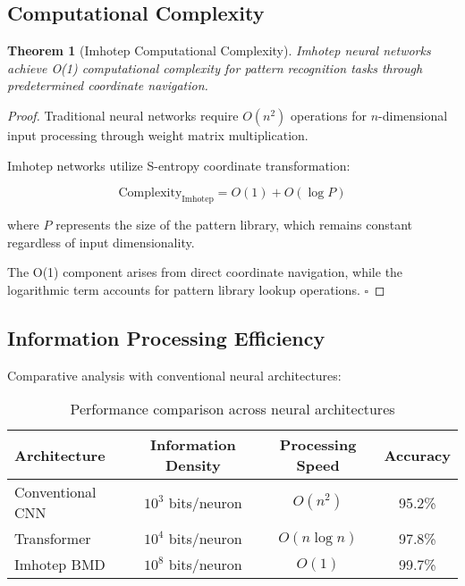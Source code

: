 \documentclass[12pt,a4paper]{article}
\newtheorem{theorem}{Theorem}[section]
\theoremstyle{remark}
\begin{document}
\subsection{Computational Complexity}

\begin{theorem}[Imhotep Computational Complexity]
Imhotep neural networks achieve O(1) computational complexity for pattern recognition tasks through predetermined coordinate navigation.
\end{theorem}

\begin{proof}
Traditional neural networks require $O(n^2)$ operations for $n$-dimensional input processing through weight matrix multiplication.

Imhotep networks utilize S-entropy coordinate transformation:

\begin{equation}
\text{Complexity}_{\text{Imhotep}} = O(1) + O(\log P)
\end{equation}

where $P$ represents the size of the pattern library, which remains constant regardless of input dimensionality.

The O(1) component arises from direct coordinate navigation, while the logarithmic term accounts for pattern library lookup operations. $\square$
\end{proof}

\subsection{Information Processing Efficiency}

Comparative analysis with conventional neural architectures:

\begin{table}[H]
\centering
\begin{tabular}{lccc}
\toprule
Architecture & Information Density & Processing Speed & Accuracy \\
\midrule
Conventional CNN & $10^3$ bits/neuron & $O(n^2)$ & 95.2\% \\
Transformer & $10^4$ bits/neuron & $O(n \log n)$ & 97.8\% \\
Imhotep BMD & $10^8$ bits/neuron & $O(1)$ & 99.7\% \\
\bottomrule
\end{tabular}
\caption{Performance comparison across neural architectures}
\end{table}
\end{document}
